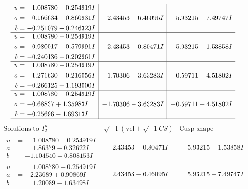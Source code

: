 \documentclass[1p]{elsarticle_modified}
\theoremstyle{definition}
\newcommand{\I}{\sqrt{-1}}
\begin{document}
$$\begin{array}{c|c|c}
\begin{aligned}
u &= \phantom{-}1.008780 - 0.254919 I \\
a &= -0.166634 + 0.860931 I \\
b &= -0.251079 + 0.246323 I\end{aligned}
 & \phantom{-}2.43453 - 6.46095 I & \phantom{-}5.93215 + 7.49747 I \\ \hline\begin{aligned}
u &= \phantom{-}1.008780 - 0.254919 I \\
a &= \phantom{-}0.980017 - 0.579991 I \\
b &= -0.240136 + 0.202961 I\end{aligned}
 & \phantom{-}2.43453 - 0.80471 I & \phantom{-}5.93215 + 1.53858 I \\ \hline\begin{aligned}
u &= \phantom{-}1.008780 - 0.254919 I \\
a &= \phantom{-}1.271630 - 0.216056 I \\
b &= -0.266125 + 1.193000 I\end{aligned}
 & -1.70306 - 3.63283 I & -0.59711 + 4.51802 I \\ \hline\begin{aligned}
u &= \phantom{-}1.008780 - 0.254919 I \\
a &= -0.68837 + 1.35983 I \\
b &= -0.25696 - 1.69313 I\end{aligned}
 & -1.70306 - 3.63283 I & -0.59711 + 4.51802 I\\
 \hline 
 \end{array}$$\newpage$$\begin{array}{c|c|c}  
\text{Solutions to }I^u_{2}& \I (\text{vol} + \sqrt{-1}CS) & \text{Cusp shape}\\
 \hline 
\begin{aligned}
u &= \phantom{-}1.008780 - 0.254919 I \\
a &= \phantom{-}1.86379 - 0.32622 I \\
b &= -1.104540 + 0.808153 I\end{aligned}
 & \phantom{-}2.43453 - 0.80471 I & \phantom{-}5.93215 + 1.53858 I \\ \hline\begin{aligned}
u &= \phantom{-}1.008780 - 0.254919 I \\
a &= -2.23689 + 0.90869 I \\
b &= \phantom{-}1.20089 - 1.63498 I\end{aligned}
 & \phantom{-}2.43453 - 6.46095 I & \phantom{-}5.93215 + 7.49747 I \\ \hline\begin{aligned}

\end{aligned}
\end{array}$$
\end{document}
